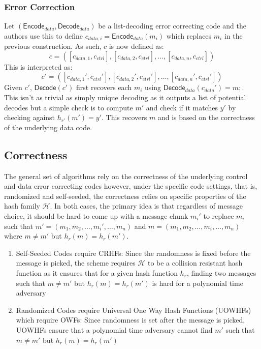 \documentclass[12pt]{article}%
\begin{document}
\subsubsection{Error Correction}
Let $(\textsf{Encode}_{data}, \textsf{Decode}_{data})$ be a list-decoding error correcting code and the authors use this to define $c_{data, i} = \textsf{Encode}_{data}(m_i)$ which replaces $m_i$ in the previous construction. As such, $c$ is now defined as: $$c = ([c_{data, 1}, c_{ctrl}], [c_{data, 2}, c_{ctrl}], \ldots, [c_{data, n}, c_{ctrl}])$$ This is interpreted as: $$c' = ([c_{data, 1}', c_{ctrl}'], [c_{data, 2}', c_{ctrl}'], \ldots, [c_{data, n}', c_{ctrl}'])$$ Given $c'$, $\textsf{Decode}(c')$ first recovers each $m_i$ using $\textsf{Decode}_{data}(c_{data}') = m;$. This isn't as trivial as simply unique decoding as it outputs a list of potential decodes but a simple check is to compute $m'$ and check if it matches $y'$ by checking against $h_{r'}(m') = y'$. This recovers $m$ and is based on the correctness of the underlying data code.  

\subsection{Correctness}

The general set of algorithms rely on the correctness of the underlying control and data error correcting codes however, under the specific code settings, that is, randomized and self-seeded, the correctness relies on specific properties of the hash family $\mathcal{H}$. In both cases, the primary idea is that regardless of message choice, it should be hard to come up with a message chunk $m_i'$ to replace $m_i$ such that $m' = (m_1, m_2, \ldots, m_i', \ldots, m_n)$ and $m = (m_1, m_2, \ldots, m_i, \ldots, m_n)$ where $m \neq m'$ but $h_r(m) = h_r(m')$. 

\begin{enumerate}
    \item Self-Seeded Codes require CRHFs: Since the randomness is fixed before the message is picked, the scheme requires $\mathcal{H}$ to be a collision resistant hash function as it ensures that for a given hash function $h_r$, finding two messages such that $m \neq m'$ but $h_r(m) = h_r(m')$ is hard for a polynomial time adversary
    \item Randomized Codes require Universal One Way Hash Functions (UOWHFs) which require OWFs: Since randomness is set after the message is picked, UOWHFs ensure that a polynomial time adversary cannot find $m'$ such that $m \neq m'$ but $h_r(m) = h_r(m')$
\end{enumerate}
\end{document}
